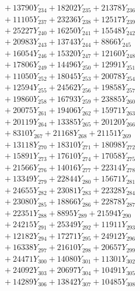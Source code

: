 \documentclass[a4paper,10pt]{article}
\begin{document}
{\begin{align}
&\;  + 13790 Y_{234} + 18202 Y_{235} + 21378 Y_{236} \\[0.3ex]
&\;  + 11105 Y_{237} + 23236 Y_{238} + 12517 Y_{239} \\[0.5ex]\allowbreak
&\;  + 25227 Y_{240} + 16250 Y_{241} + 15548 Y_{242} \\[0.3ex]
&\;  + 20983 Y_{243} + 13743 Y_{244} + 8866 Y_{245} \\[0.3ex]
&\;  + 16054 Y_{246} + 15320 Y_{247} + 12160 Y_{248} \\[0.3ex]
&\;  + 17806 Y_{249} + 14496 Y_{250} + 12991 Y_{251} \\[0.3ex]
&\;  + 11050 Y_{252} + 18045 Y_{253} + 20078 Y_{254} \\[0.3ex]
&\;  + 12594 Y_{255} + 24562 Y_{256} + 19858 Y_{257} \\[0.3ex]
&\;  + 19860 Y_{258} + 16793 Y_{259} + 23885 Y_{260} \\[0.3ex]
&\;  + 20075 Y_{261} + 19406 Y_{262} + 15971 Y_{263} \\[0.3ex]
&\;  + 20119 Y_{264} + 13385 Y_{265} + 20120 Y_{266} \\[0.3ex]
&\;  + 8310 Y_{267} + 21168 Y_{268} + 21151 Y_{269} \\[0.5ex]\allowbreak
&\;  + 13118 Y_{270} + 18310 Y_{271} + 18098 Y_{272} \\[0.3ex]
&\;  + 15891 Y_{273} + 17610 Y_{274} + 17058 Y_{275} \\[0.3ex]
&\;  + 21566 Y_{276} + 14016 Y_{277} + 22314 Y_{278} \\[0.3ex]
&\;  + 13349 Y_{279} + 22844 Y_{280} + 15671 Y_{281} \\[0.3ex]
&\;  + 24655 Y_{282} + 23081 Y_{283} + 22328 Y_{284} \\[0.3ex]
&\;  + 23080 Y_{285} + 18866 Y_{286} + 22878 Y_{287} \\[0.3ex]
&\;  + 22351 Y_{288} + 8895 Y_{289} + 21594 Y_{290} \\[0.3ex]
&\;  + 24215 Y_{291} + 25349 Y_{292} + 11911 Y_{293} \\[0.3ex]
&\;  + 12182 Y_{294} + 17271 Y_{295} + 24912 Y_{296} \\[0.3ex]
&\;  + 16338 Y_{297} + 21610 Y_{298} + 20657 Y_{299} \\[0.5ex]\allowbreak
&\;  + 24471 Y_{300} + 14080 Y_{301} + 11301 Y_{302} \\[0.3ex]
&\;  + 24092 Y_{303} + 20697 Y_{304} + 10491 Y_{305} \\[0.3ex]
&\;  + 14289 Y_{306} + 13842 Y_{307} + 10485 Y_{308} \\[0.3ex]

\end{align}}
\end{document}
